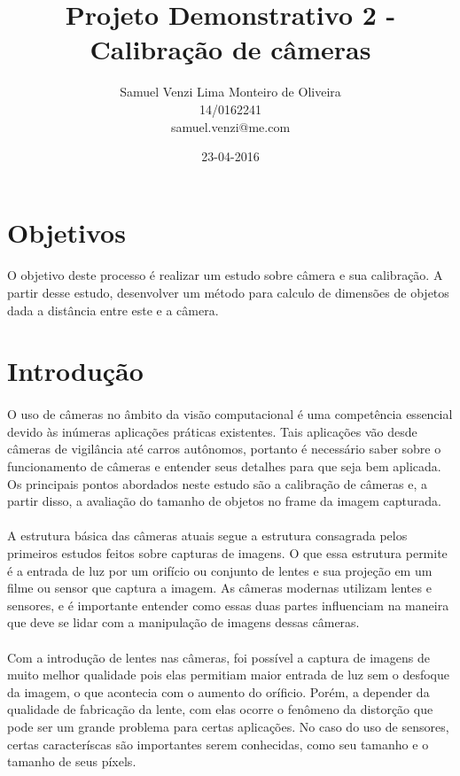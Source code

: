 \documentclass{article}
\begin{document}
\title{Projeto Demonstrativo 2 - Calibração de câmeras}
\date{23-04-2016}
\author{Samuel Venzi Lima Monteiro de Oliveira\\14/0162241\\samuel.venzi@me.com}

	\maketitle

	\section{Objetivos}
		\paragraph{}
		O objetivo deste processo é realizar um estudo sobre câmera e sua calibração. A partir desse estudo, desenvolver um método para calculo de dimensões de objetos dada a distância entre este e a câmera.
	\section{Introdução}
		\paragraph{}
		O uso de câmeras no âmbito da visão computacional é uma competência essencial devido às inúmeras aplicações práticas existentes. Tais aplicações vão desde câmeras de vigilância até carros autônomos, portanto é necessário saber sobre o funcionamento de câmeras e entender seus detalhes para que seja bem aplicada. Os principais pontos abordados neste estudo são a calibração de câmeras e, a partir disso, a avaliação do tamanho de objetos no frame da imagem capturada.
		\paragraph{}
		A estrutura básica das câmeras atuais segue a estrutura consagrada pelos primeiros estudos feitos sobre capturas de imagens. O que essa estrutura permite é a entrada de luz por um orifício ou conjunto de lentes e sua projeção em um filme ou sensor que captura a imagem. As câmeras modernas utilizam lentes e sensores, e é importante entender como essas duas partes influenciam na maneira que deve se lidar com a manipulação de imagens dessas câmeras.
		\paragraph{}
		Com a introdução de lentes nas câmeras, foi possível a captura de imagens de muito melhor qualidade pois elas permitiam maior entrada de luz sem o desfoque da imagem, o que acontecia com o aumento do oríficio. Porém, a depender da qualidade de fabricação da lente, com elas ocorre o fenômeno da distorção que pode ser um grande problema para certas aplicações. No caso do uso de sensores, certas caracteríscas são importantes serem conhecidas, como seu tamanho e o tamanho de seus píxels.
\end{document}
